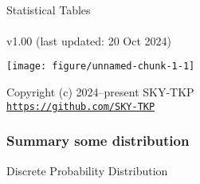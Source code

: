\documentclass[
]{article}
\author{}
\date{\vspace{-2.5em}}
\begin{document}
\thispagestyle{empty}
\begin{center}
~\\
\vspace{2cm}
{\Huge Statistical Tables}
~\\~\\
v1.00 (last updated: 20 Oct 2024)
\vspace{5cm}
\end{center}

\begin{center}\texttt{[image: figure/unnamed-chunk-1-1]} \end{center}

\vfill
\begin{center}
Copyright (c) 2024--present SKY-TKP
~\\
\href{https://github.com/SKY-TKP}{\texttt{https://github.com/SKY-TKP}}
\end{center}

\newpage

\subsubsection{Summary some
distribution}\label{summary-some-distribution}

Discrete Probability Distribution
\end{document}
